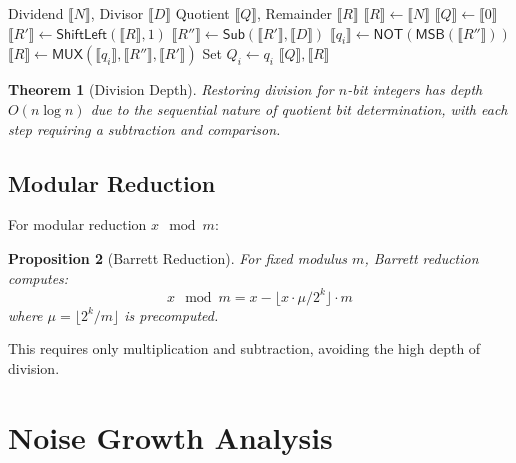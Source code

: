 \documentclass[11pt,a4paper]{article}
\newtheorem{theorem}{Theorem}[section]
\newtheorem{proposition}[theorem]{Proposition}
\begin{document}
\begin{algorithm}
\caption{Restoring Division}
\begin{algorithmic}[1]
\Require Dividend $\llbracket N \rrbracket$, Divisor $\llbracket D \rrbracket$
\Ensure Quotient $\llbracket Q \rrbracket$, Remainder $\llbracket R \rrbracket$
\State $\llbracket R \rrbracket \gets \llbracket N \rrbracket$
\State $\llbracket Q \rrbracket \gets \llbracket 0 \rrbracket$
    \State $\llbracket R' \rrbracket \gets \textsf{ShiftLeft}(\llbracket R \rrbracket, 1)$
    \State $\llbracket R'' \rrbracket \gets \textsf{Sub}(\llbracket R' \rrbracket, \llbracket D \rrbracket)$
    \State $\llbracket q_i \rrbracket \gets \textsf{NOT}(\textsf{MSB}(\llbracket R'' \rrbracket))$ 
    \State $\llbracket R \rrbracket \gets \textsf{MUX}(\llbracket q_i \rrbracket, \llbracket R'' \rrbracket, \llbracket R' \rrbracket)$
    \State Set $Q_i \gets q_i$
\EndFor
\State \Return $\llbracket Q \rrbracket, \llbracket R \rrbracket$
\end{algorithmic}
\end{algorithm}

\begin{theorem}[Division Depth]
Restoring division for $n$-bit integers has depth $O(n \log n)$ due to the sequential nature of quotient bit determination, with each step requiring a subtraction and comparison.
\end{theorem}

\subsection{Modular Reduction}

For modular reduction $x \mod m$:

\begin{proposition}[Barrett Reduction]
For fixed modulus $m$, Barrett reduction computes:
\begin{equation}
x \mod m = x - \lfloor x \cdot \mu / 2^k \rfloor \cdot m
\end{equation}
where $\mu = \lfloor 2^k / m \rfloor$ is precomputed.
\end{proposition}

This requires only multiplication and subtraction, avoiding the high depth of division.

\section{Noise Growth Analysis}
\end{document}
